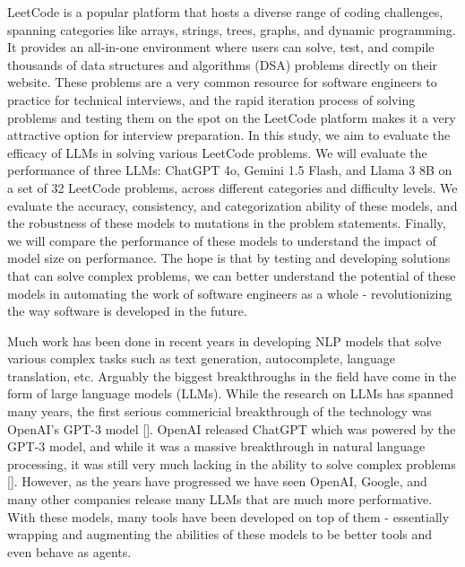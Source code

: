 \documentclass[times, 10pt,twocolumn]{article}
\begin{document}
LeetCode is a popular platform that hosts a diverse range of coding challenges, spanning categories like arrays, strings, trees, graphs, and dynamic programming. It provides an all-in-one environment where users can solve, test, and compile thousands of data structures and algorithms (DSA) problems directly on their website. These problems are a very common resource for software engineers to practice for technical interviews, and the rapid iteration process of solving problems and testing them on the spot on the LeetCode platform makes it a very attractive option for interview preparation. In this study, we aim to evaluate the efficacy of LLMs in solving various LeetCode problems. We will evaluate the performance of three LLMs: ChatGPT 4o, Gemini 1.5 Flash, and Llama 3 8B on a set of 32 LeetCode problems, across different categories and difficulty levels. We evaluate the accuracy, consistency, and categorization ability of these models, and the robustness of these models to mutations in the problem statements. Finally, we will compare the performance of these models to understand the impact of model size on performance. The hope is that by testing and developing solutions that can solve complex problems, we can better understand the potential of these models in automating the work of software engineers as a whole - revolutionizing the way software is developed in the future.



Much work has been done in recent years in developing NLP models that solve various complex tasks such as text generation, autocomplete, language translation, etc. Arguably the biggest breakthroughs in the field have come in the form of large language models (LLMs). While the research on LLMs has spanned many years, the first serious commericial breakthrough of the technology was OpenAI's GPT-3 model []. OpenAI released ChatGPT which was powered by the GPT-3 model, and while it was a massive breakthrough in natural language processing, it was still very much lacking in the ability to solve complex problems []. However, as the years have progressed we have seen OpenAI, Google, and many other companies release many LLMs that are much more performative. With these models, many tools have been developed on top of them - essentially wrapping and augmenting the abilities of these models to be better tools and even behave as agents.
\end{document}
